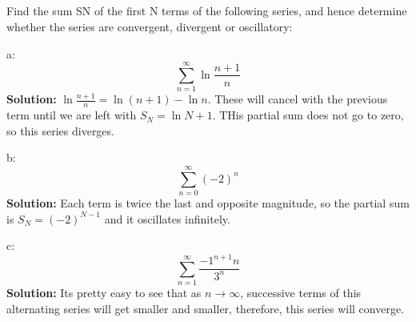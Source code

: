 \documentclass{article}
\begin{document}
\subsection{}
Find the sum SN of the first N terms of the following series, and hence determine whether the series are convergent, divergent or oscillatory:

a: $$\sum_{n=1}^{\infty} \ln \frac{n+1}{n}$$
\textbf{Solution:} $\ln \frac{n+1}{n} = \ln (n+1) - \ln n$. These will cancel with the previous term until we are left with $S_N = \ln N+1$. THis partial sum does not go to zero, so this series diverges.

b: $$\sum_{n=0}^{\infty} (-2)^n$$
\textbf{Solution:} Each term is twice the last and opposite magnitude, so the partial sum is $S_N = (-2)^{N-1}$ and it oscillates infinitely.

c: $$\sum_{n=1}^{\infty} \frac{-1^{n+1}n}{3^n}$$
\textbf{Solution:} Its pretty easy to see that as $n \to \infty$, successive terms of this alternating series will get smaller and smaller, therefore, this series will converge.   
\end{document}
